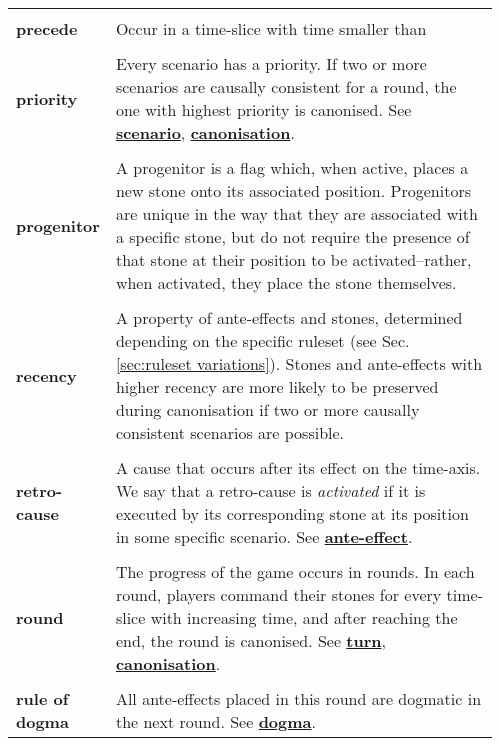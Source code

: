 {\begin{longtable}{ R{0.15\linewidth}  L{0.81\linewidth}  }
 \\* \textbf{precede} & \parbox[t]{\linewidth}{Occur in a time-slice with time smaller than}\\
 \\* \textbf{priority} & \parbox[t]{\linewidth}{Every scenario has a priority. If two or more scenarios are causally consistent for a round, the one with highest priority is canonised. See \hyperref[glossary:scenario]{\textbf{scenario}}, \hyperref[glossary:canonisation]{\textbf{canonisation}}.}\\
 \\* \textbf{progenitor} & \parbox[t]{\linewidth}{A progenitor is a flag which, when active, places a new stone onto its associated position. Progenitors are unique in the way that they are associated with a specific stone, but do not require the presence of that stone at their position to be activated--rather, when activated, they place the stone themselves.}\\
 \\* \textbf{recency} & \parbox[t]{\linewidth}{A property of ante-effects and stones, determined depending on the specific ruleset (see Sec. \ref{sec:ruleset variations}). Stones and ante-effects with higher recency are more likely to be preserved during canonisation if two or more causally consistent scenarios are possible.}\\
 \\* \textbf{retro-cause} & \parbox[t]{\linewidth}{A cause that occurs after its effect on the time-axis. We say that a retro-cause is \textit{activated} if it is executed by its corresponding stone at its position in some specific scenario. See \hyperref[glossary:ante-effect]{\textbf{ante-effect}}.}\\
 \\* \textbf{round} & \parbox[t]{\linewidth}{The progress of the game occurs in rounds. In each round, players command their stones for every time-slice with increasing time, and after reaching the end, the round is canonised. See \hyperref[glossary:turn]{\textbf{turn}}, \hyperref[glossary:canonisation]{\textbf{canonisation}}.}\\
 \\* \textbf{rule of dogma} & \parbox[t]{\linewidth}{All ante-effects placed in this round are dogmatic in the next round. See \hyperref[glossary:dogma]{\textbf{dogma}}.}\\

\end{longtable}}
